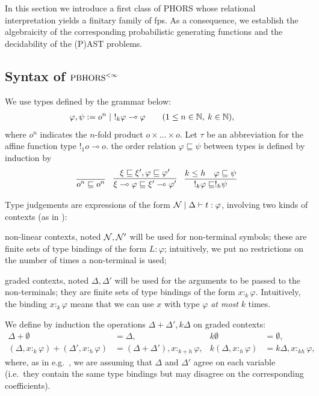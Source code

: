

In this section we introduce a first class of PHORS whose relational interpretation yields a finitary family of fps. 
As a consequence, we establish the algebraicity of the corresponding probabilistic generating functions and the decidability of the (P)AST problems.


\subsection{Syntax of $\text{PBHORS}^{<\infty}$ }



We use types defined by the grammar below:
\begin{align*}
\varphi,\psi&:= o^n\mid \  !_k\varphi\multimap \varphi
 \qquad (1\leq n\in\mathbb N, \: k \in \mathbb N),
\end{align*}
where $o^n$ indicates the $n$-fold product $o\times\dots \times o$.
Let $\tau$ be an abbreviation for the affine function type $!_1o\multimap o$. the order relation $\varphi\sqsubseteq \psi$ between types is defined by induction by
\begin{align*}
\infer{\1^n\sqsubseteq\1^n}{}
\quad \infer{\xi\multimap\varphi\sqsubseteq\xi'\multimap\varphi'}{\xi\sqsubseteq \xi', \varphi\sqsubseteq\varphi'}
\quad
\infer{!_k\varphi\sqsubseteq !_h\psi}{k\leq h \quad\varphi\sqsubseteq\psi}
\end{align*}

Type judgements are expressions of the form $\mathcal{N}\mid\Delta\vdash t:\varphi$, involving two kinds of contexts (as in \cite{DBLP:conf/lics/LiMO22}): 
\begin{varitemize}
\item non-linear contexts, noted $\mathcal{N},\mathcal{N}'$ will be used for non-terminal symbols; these are finite sets of type bindings of the form $L:\varphi$; intuitively, we put no restrictions on the number of times a non-terminal is used;


\item graded contexts, noted $\Delta,\Delta'$ will be used for the arguments to be passed to the non-terminals; they are finite sets of type bindings of the form $x:_k \varphi$. Intuitively, the binding $x :_k \varphi$ means that we can use $x$ with type $\varphi$ \emph{at most} $k$ times.
\end{varitemize}
\noindent We define by induction the operations $\Delta+\Delta',k\Delta$ on graded contexts:
\begin{align*}
\Delta +\emptyset &= \Delta, & k\emptyset&=\emptyset,\\
(\Delta,x:_{k}\varphi) + (\Delta',x:_{h}\varphi) &= (\Delta+\Delta'),x:_{k+h}\varphi, & k(\Delta,x:_{h}\varphi)  &= k\Delta,x:_{kh}\varphi,
\end{align*}
where, as in e.g.~\cite{10.1145/3009837.3009890}, we are assuming that $\Delta$ and $\Delta'$ agree on each variable (i.e.~they contain the same type bindings but may disagree on the corresponding coefficients). 

